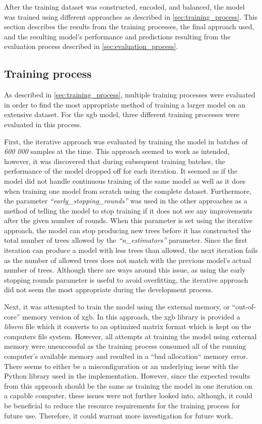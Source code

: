 After the training dataset was constructed, encoded, and balanced, the model was trained using different approaches as described in \cref{sec:training_process}. This section describes the results from the training processes, the final approach used, and the resulting model's performance and predictions resulting from the evaluation process described in \cref{sec:evaluation_process}.

\subsection{Training process}

As described in \cref{sec:training_process}, multiple training processes were evaluated in order to find the most appropriate method of training a larger model on an extensive dataset. For the \acrfull{xgb} model, three different training processes were evaluated in this process.

First, the iterative approach was evaluated by training the model in batches of \textit{600 000} samples at the time. This approach seemed to work as intended, however, it was discovered that during subsequent training batches, the performance of the model dropped off for each iteration. It seemed as if the model did not handle continuous training of the same model as well as it does when training one model from scratch using the complete dataset. Furthermore, the parameter \textit{``early\_stopping\_rounds''} was used in the other approaches as a method of telling the model to stop training if it does not see any improvements after the given number of rounds. When this parameter is set using the iterative approach, the model can stop producing new trees before it has constructed the total number of trees allowed by the \textit{``n\_estimators''} parameter. Since the first iteration can produce a model with less trees than allowed, the next iteration fails as the number of allowed trees does not match with the previous model's actual number of trees. Although there are ways around this issue, as using the early stopping rounds parameter is useful to avoid overfitting, the iterative approach did not seem the most appropriate during the development process.

Next, it was attempted to train the model using the external memory, or ``out-of-core'' memory version of \acrshort{xgb}. In this approach, the \acrshort{xgb} library is provided a \textit{libsvm} file which it converts to an optimized matrix format which is kept on the computers file system. However, all attempts at training the model using external memory were unsuccessful as the training process consumed all of the running computer's available memory and resulted in a ``bad allocation`` memory error. There seems to either be a misconfiguration or an underlying issue with the Python library used in the implementation. However, since the expected results from this approach should be the same as training the model in one iteration on a capable computer, these issues were not further looked into, although, it could be beneficial to reduce the resource requirements for the training process for future use. Therefore, it could warrant more investigation for future work.

